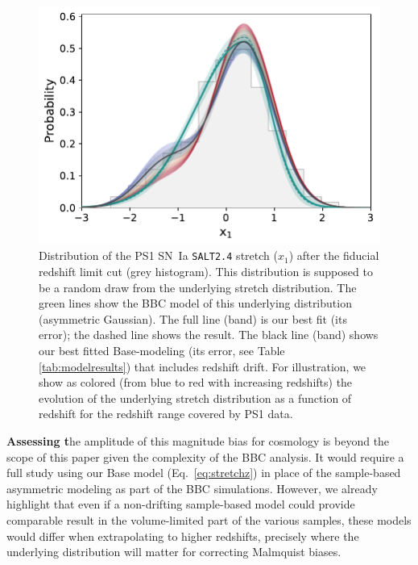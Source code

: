 \documentclass[referee]{aa}
\begin{document}
\begin{figure}
    \centering
    \includegraphics[width=\linewidth]{Article_figures/bbc_comp_PS1_hist-nr.pdf}
    \caption{Distribution of the PS1 SN~Ia \textsc{\texttt{SALT2.4}} stretch
        ($x_1$) after the fiducial redshift limit cut (grey histogram). This
        distribution is supposed to be a random draw from the underlying stretch
        distribution. The green lines show the BBC model of this underlying
        distribution (asymmetric Gaussian). The full line (band) is our best fit
        (its error); the dashed line shows the \cite{scolnic2018a} result. The
        black line (band) shows our best fitted Base-modeling (its error, see
        Table \ref{tab:modelresults}) that includes redshift drift. For
        illustration, we show as colored (from blue to red with increasing
        redshifts) the evolution of the underlying stretch distribution as a
        function of redshift for the redshift range covered by PS1 data.}
    \label{fig:bbc_pdf_ps1}
\end{figure}

\textbf{Assessing t}he amplitude of this magnitude bias for cosmology is beyond
the scope of this paper given the complexity of the BBC analysis. It would
require a full study using our Base model (Eq.~\ref{eq:stretchz}) in place of
the sample-based asymmetric modeling as part of the BBC simulations. However, we
already highlight that even if a non-drifting sample-based model could provide
comparable result in the volume-limited part of the various samples, these
models would differ when extrapolating to higher redshifts, precisely where the
underlying distribution will matter for correcting Malmquist biases.
\end{document}
